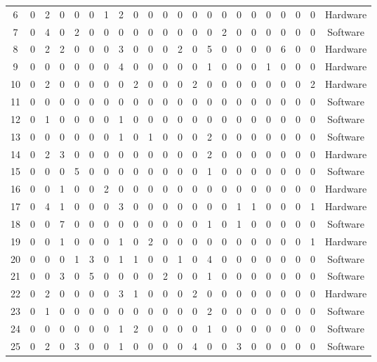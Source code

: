 \begin{table}[!ht]
\begin{center}
\begin{scriptsize}
\begin{tabular}{cccccccccccccccccccccc}
6 & 0 & 2 & 0 & 0 & 0 & 1 & 2 & 0 & 0 & 0 & 0 & 0 & 0 & 0 & 0 & 0 & 0 & 0 & 0 & 0 & Hardware\\
7 & 0 & 4 & 0 & 2 & 0 & 0 & 0 & 0 & 0 & 0 & 0 & 0 & 0 & 2 & 0 & 0 & 0 & 0 & 0 & 0 & Software\\
8 & 0 & 2 & 2 & 0 & 0 & 0 & 3 & 0 & 0 & 0 & 2 & 0 & 5 & 0 & 0 & 0 & 0 & 6 & 0 & 0 & Hardware\\
9 & 0 & 0 & 0 & 0 & 0 & 0 & 4 & 0 & 0 & 0 & 0 & 0 & 1 & 0 & 0 & 0 & 1 & 0 & 0 & 0 & Hardware\\
10 & 0 & 2 & 0 & 0 & 0 & 0 & 0 & 2 & 0 & 0 & 0 & 2 & 0 & 0 & 0 & 0 & 0 & 0 & 0 & 2 & Hardware\\
11 & 0 & 0 & 0 & 0 & 0 & 0 & 0 & 0 & 0 & 0 & 0 & 0 & 0 & 0 & 0 & 0 & 0 & 0 & 0 & 0 & Software\\
12 & 0 & 1 & 0 & 0 & 0 & 0 & 1 & 0 & 0 & 0 & 0 & 0 & 0 & 0 & 0 & 0 & 0 & 0 & 0 & 0 & Software\\
13 & 0 & 0 & 0 & 0 & 0 & 0 & 1 & 0 & 1 & 0 & 0 & 0 & 2 & 0 & 0 & 0 & 0 & 0 & 0 & 0 & Software\\
14 & 0 & 2 & 3 & 0 & 0 & 0 & 0 & 0 & 0 & 0 & 0 & 0 & 2 & 0 & 0 & 0 & 0 & 0 & 0 & 0 & Hardware\\
15 & 0 & 0 & 0 & 5 & 0 & 0 & 0 & 0 & 0 & 0 & 0 & 0 & 1 & 0 & 0 & 0 & 0 & 0 & 0 & 0 & Software\\
16 & 0 & 0 & 1 & 0 & 0 & 2 & 0 & 0 & 0 & 0 & 0 & 0 & 0 & 0 & 0 & 0 & 0 & 0 & 0 & 0 & Hardware\\
17 & 0 & 4 & 1 & 0 & 0 & 0 & 3 & 0 & 0 & 0 & 0 & 0 & 0 & 0 & 1 & 1 & 0 & 0 & 0 & 1 & Hardware\\
18 & 0 & 0 & 7 & 0 & 0 & 0 & 0 & 0 & 0 & 0 & 0 & 0 & 1 & 0 & 1 & 0 & 0 & 0 & 0 & 0 & Software\\
19 & 0 & 0 & 1 & 0 & 0 & 0 & 1 & 0 & 2 & 0 & 0 & 0 & 0 & 0 & 0 & 0 & 0 & 0 & 0 & 1 & Hardware\\
20 & 0 & 0 & 0 & 1 & 3 & 0 & 1 & 1 & 0 & 0 & 1 & 0 & 4 & 0 & 0 & 0 & 0 & 0 & 0 & 0 & Software\\
21 & 0 & 0 & 3 & 0 & 5 & 0 & 0 & 0 & 0 & 2 & 0 & 0 & 1 & 0 & 0 & 0 & 0 & 0 & 0 & 0 & Software\\
22 & 0 & 2 & 0 & 0 & 0 & 0 & 3 & 1 & 0 & 0 & 0 & 2 & 0 & 0 & 0 & 0 & 0 & 0 & 0 & 0 & Hardware\\
23 & 0 & 1 & 0 & 0 & 0 & 0 & 0 & 0 & 0 & 0 & 0 & 0 & 2 & 0 & 0 & 0 & 0 & 0 & 0 & 0 & Software\\
24 & 0 & 0 & 0 & 0 & 0 & 0 & 1 & 2 & 0 & 0 & 0 & 0 & 1 & 0 & 0 & 0 & 0 & 0 & 0 & 0 & Software\\
25 & 0 & 2 & 0 & 3 & 0 & 0 & 1 & 0 & 0 & 0 & 0 & 4 & 0 & 0 & 3 & 0 & 0 & 0 & 0 & 0 & Software\\

\end{tabular}
\end{scriptsize}
\end{center}
\end{table}
